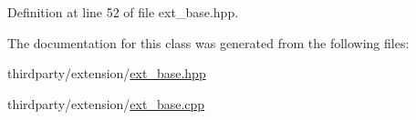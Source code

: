 Definition at line 52 of file ext\+\_\+base.\+hpp.



The documentation for this class was generated from the following files\+:\begin{DoxyCompactItemize}
\item 
thirdparty/extension/\hyperlink{ext__base_8hpp}{ext\+\_\+base.\+hpp}\item 
thirdparty/extension/\hyperlink{ext__base_8cpp}{ext\+\_\+base.\+cpp}\end{DoxyCompactItemize}
